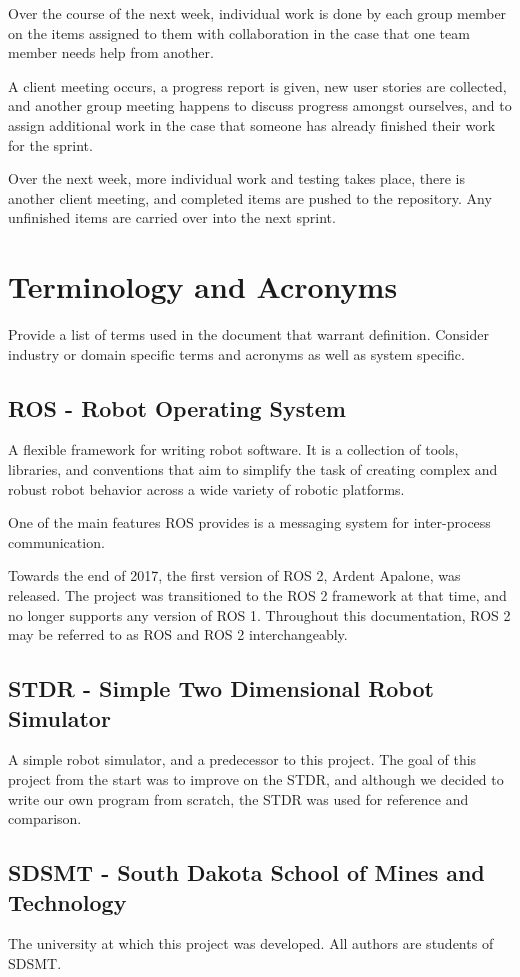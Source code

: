 Over the course of the next week, individual work is done by each group member on the items assigned to them with collaboration in the case that one team member needs help from another.

A client meeting occurs, a progress report is given, new user stories are collected, and another group meeting happens to discuss progress amongst ourselves, and to assign additional work in the case that someone has already finished their work for the sprint.

Over the next week, more individual work and testing takes place, there is another client meeting, and completed items are pushed to the repository. Any unfinished items are carried over into the next sprint.

\section{Terminology and Acronyms}
Provide a list of terms used in the document that warrant definition.  Consider 
industry or domain specific terms and acronyms as well as system specific. 

\subsection{ROS - Robot Operating System}
A flexible framework for writing robot software. It is a collection of tools, libraries, and conventions that aim to simplify the task of creating complex and robust robot behavior across a wide variety of robotic platforms.

One of the main features ROS provides is a messaging system for inter-process communication.

Towards the end of 2017, the first version of ROS 2, Ardent Apalone, was released. The project was transitioned to the ROS 2 framework at that time, and no longer supports any version of ROS 1. Throughout this documentation, ROS 2 may be referred to as ROS and ROS 2 interchangeably.

\subsection{STDR - Simple Two Dimensional Robot Simulator}
A simple robot simulator, and a predecessor to this project. The goal of this project from the start was to improve on the STDR, and although we decided to write our own program from scratch, the STDR was used for reference and comparison.

\subsection{SDSMT - South Dakota School of Mines and Technology}
The university at which this project was developed. All authors are students of SDSMT.

